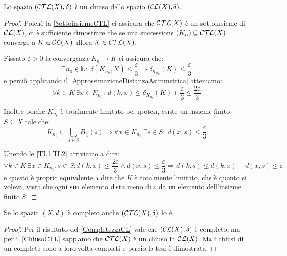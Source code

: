 \begin{lemma}\label{ChiusoCTL}
	Lo spazio $(\mathcal{CTL}(X),\delta)$ è un chiuso dello spazio $(\mathcal{CL}(X),\delta)$.
\end{lemma}
\begin{proof}
	Poichè la \cref{SottoinsiemeCTL} ci assicura che $\mathcal{CTL}(X)$ è un sottoinsieme di $\mathcal{CL}(X)$, ci è sufficiente dimostrare che se una successione $(K_n) \subseteq \mathcal{CTL}(X)$ converge a $K\in\mathcal{CL}(X)$ allora $K\in\mathcal{CTL}(X)$.
	
	Fissato $\varepsilon>0$ la convergenza $K_n\to K$ ci assicura che:
	\begin{equation*}
		\exists n_0\in\mathbb{N}:\ \delta(K_{n_0},K)\le \frac{\varepsilon}3
		\Longrightarrow \delta_{K_{n_0}}(K)\le \frac{\varepsilon}3
	\end{equation*}
	e perciò applicando il \cref{ApprossimazioneDistanzaAsimmetrica} otteniamo:
	\begin{equation}\label{TL1}
		\forall k\in K\ \exists x\in K_{n_0}:
		\ d(k,x)\le \delta_{K_{n_0}}(K)+\frac{\varepsilon}3\le \frac{2\varepsilon}3
	\end{equation}
	
	Inoltre poiché $K_{n_0}$ è totalmente limitato per ipotesi, esiste un insieme finito $S \subseteq X$ tale che:
	\begin{equation}\label{TL2}
		K_{n_0}\subseteq \bigcup_{s\in S} B_{\frac{\varepsilon}3}(s)
		\Longrightarrow \forall x\in K_{n_0}\ \exists s\in S:\ d(x,s)\le \frac{\varepsilon}3
	\end{equation}
	
	Unendo le \cref{TL1,TL2} arriviamo a dire:
	\begin{equation}
		\forall k\in K\ \exists x\in K_{n_0},s\in S: d(k,x)\le \frac{2\varepsilon}3 \wedge d(x,s)\le \frac{\varepsilon}3
		\Longrightarrow d(k,s)\le d(k,x)+d(x,s) \le \varepsilon
	\end{equation}
	e questo è proprio equivalente a dire che $K$ è totalmente limitato, che è quanto si voleva, visto che ogni suo elemento dista meno di $\varepsilon$ da un elemento dell'insieme finito $S$.
\end{proof}

\begin{corollary}\label{CompletezzaCTL}
	Se lo spazio $(X,d)$ è completo anche $(\mathcal{CTL}(X),\delta)$ lo è.
\end{corollary}
\begin{proof}
	Per il risultato del \cref{CompletezzaCL} vale che $(\mathcal{CL}(X),\delta)$ è completo, ma per il \cref{ChiusoCTL} sappiamo che $\mathcal{CTL}(X)$ è un chiuso in $\mathcal{CL}(X)$. Ma i chiusi di un completo sono a loro volta completi e perciò la tesi è dimostrata.
\end{proof}

